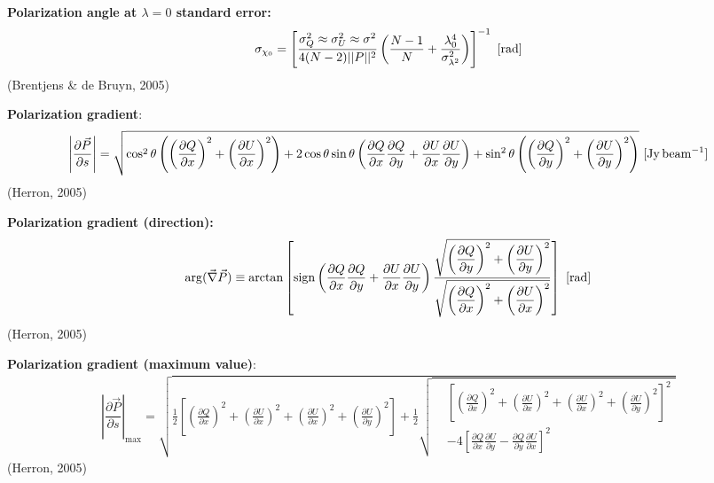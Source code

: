 \documentclass[a4paper,10pt]{article}
\begin{document}
{\noindent}\textbf{Polarization angle at $\lambda=0$ standard error:} 
\begin{align*}
\sigma_{\chi_0} = \left[ \dfrac{\sigma_Q^2\approx\sigma_U^2\approx\sigma^2}{4(N-2)\lvert\lvert P \rvert\rvert^2} \left( \dfrac{N-1}{N} + \dfrac{\lambda_0^4}{\sigma_{\lambda^2}^2} \right) \right]^{-1} ~ [{\rm rad}]
\end{align*}
(Brentjens \& de Bruyn, 2005)

{\noindent}\textbf{Polarization gradient}:
\begin{align*}
	\left\lvert\dfrac{\partial\vec{P}}{\partial s}\right\rvert = \sqrt{ \cos^2\theta\left(\left(\frac{\partial Q}{\partial x}\right)^2+\left(\frac{\partial U}{\partial x}\right)^2\right) + 2\cos\theta\sin\theta\left(\frac{\partial Q}{\partial x}\frac{\partial Q}{\partial y} + \frac{\partial U}{\partial x}\frac{\partial U}{\partial y}\right) + \sin^2\theta\left(\left(\frac{\partial Q}{\partial y}\right)^2 + \left(\frac{\partial U}{\partial y}\right)^2\right) } ~ [\rm Jy\,beam^{-1}]
\end{align*}
(Herron, 2005)

{\noindent}\textbf{Polarization gradient (direction):}
\begin{align*}
    \mathrm{arg}(\vec\nabla\vec{P}) \equiv \arctan \left[ \mathrm{sign} \left(\dfrac{\partial Q}{\partial x}\dfrac{\partial Q}{\partial y} + \dfrac{\partial U}{\partial x}\dfrac{\partial U}{\partial y}\right) \dfrac{\sqrt{\left(\dfrac{\partial Q}{\partial y}\right)^2 + \left(\dfrac{\partial U}{\partial y}\right)^2}}{\sqrt{\left(\dfrac{\partial Q}{\partial x}\right)^2 + \left(\dfrac{\partial U}{\partial x}\right)^2}} \right] ~ [\rm rad]
\end{align*}
(Herron, 2005)

{\noindent}\textbf{Polarization gradient (maximum value)}:
\begin{equation*}
\begin{split}
\left\lvert\dfrac{\partial\vec{P}}{\partial s}\right\rvert_\mathrm{max} = \sqrt{ \frac{1}{2}\left[ \left(\frac{\partial Q}{\partial x}\right)^2 + \left(\frac{\partial U}{\partial x}\right)^2 + \left(\frac{\partial U}{\partial x}\right)^2 + \left(\frac{\partial U}{\partial y}\right)^2 \right] + \frac{1}{2} 
  \sqrt{
    \begin{aligned}
    & \left[ \left(\frac{\partial Q}{\partial x}\right)^2 + \left(\frac{\partial U}{\partial x}\right)^2 + \left(\frac{\partial U}{\partial x}\right)^2 + \left(\frac{\partial U}{\partial y}\right)^2 \right]^2 \\
    &- 4\left[ \frac{\partial Q}{\partial x}\frac{\partial U}{\partial y} - \frac{\partial Q}{\partial y}\frac{\partial U}{\partial x}  \right]^2
    \end{aligned}
    }}
\end{split}
\end{equation*}
(Herron, 2005)
\end{document}
